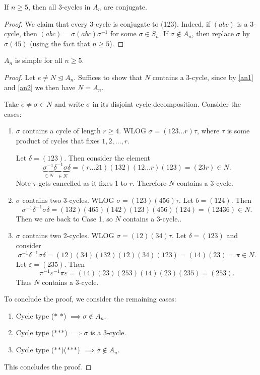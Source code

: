 \documentclass[a4paper]{scrartcl}
\begin{document}
\begin{lemma}\label{an2}
     If $n \geq 5$, then all 3-cycles in $A_n$ are conjugate. 
\end{lemma}
\begin{proof}
     We claim that every 3-cycle is conjugate to (123). Indeed, if $(abc)$ is a 3-cycle, then $(abc)=\sigma (abc) {\sigma}^{-1}$ for some $\sigma \in S_n$. If $\sigma \notin A_{n}$, then replace $\sigma$ by $\sigma (45)$ (using the fact that $n \geq 5$).
\end{proof}
\begin{theorem}
      $A_n$ is simple for all $n \geq 5$.
\end{theorem}
\begin{proof}
      Let $e \neq N \unlhd A_{n}$. Suffices to show that $N$ contains a 3-cycle, since by \ref{an1} and \ref{an2} we then have $N=A_n$.

      Take $e \neq \sigma \in N$ and write $\sigma$ in its disjoint cycle decomposition. Consider the cases: 
      \begin{enumerate}
           \item  $\sigma$ contains a cycle of length $r \geq 4$. WLOG $\sigma=(123 \ldots r)\tau$, where $\tau$ is some product of cycles that fixes $1,2, \ldots ,r$. 
           
           Let $\delta =(123)$. Then consider the element \[
           \underbrace{{\sigma}^{-1}}_{\in N} \underbrace{{\delta}^{-1} \sigma \delta}_{\in N} = (r \ldots 21)(132)(12 \ldots r)(123)=(23r) \in N
           .\] Note $\tau$ gets cancelled as it fixes 1 to $r$. Therefore $N$ contains a 3-cycle. 
           \item $\sigma$ contains two 3-cycles. WLOG $\sigma= (123)(456)\tau$. Let $b=(124).$ Then \[
               {\sigma}^{-1} {\delta}^{-1} \sigma \delta = (132)(465)(142)(123)(456)(124)=(12436) \in N
          .\] Then we are back to Case 1, so $N$ contains a 3-cycle..
          \item $\sigma$ contains two 2-cycles. WLOG $\sigma=(12)(34)\tau$. Let $\delta=(123)$ and consider \[
               {\sigma}^{-1} {\delta}^{-1} \sigma \delta = (12)(34)(132)(12)(34)(123)=(14)(23)=\pi \in N
               .\] Let $\varepsilon= (235)$. Then \[
               {\pi}^{-1}{\varepsilon}^{-1}\pi \varepsilon =(14)(23)(253)(14)(23)(235)=(253)
               .\] Thus $N$ contains a 3-cycle.
      \end{enumerate}
      To conclude the proof, we consider the remaining cases:
      \begin{enumerate}
           \item Cycle type ($\ast$ $\ast$) $\implies \sigma \notin A_n$.
           \item Cycle type ($\ast$$\ast$$\ast$) $\implies \sigma$ is a 3-cycle.
           \item Cycle type ($\ast$$\ast$)($\ast$$\ast$$\ast$) $\implies  \sigma \notin A_n$. 
      \end{enumerate}
      This concludes the proof.
\end{proof}
\end{document}
